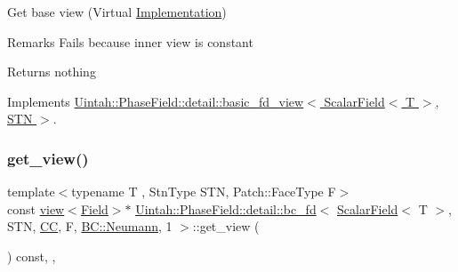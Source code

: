 Get base view (Virtual \hyperlink{classUintah_1_1PhaseField_1_1Implementation}{Implementation}) 

\begin{DoxyRemark}{Remarks}
Fails because inner view is constant
\end{DoxyRemark}
\begin{DoxyReturn}{Returns}
nothing 
\end{DoxyReturn}


Implements \hyperlink{classUintah_1_1PhaseField_1_1detail_1_1basic__fd__view_3_01ScalarField_3_01T_01_4_00_01STN_01_4_a2bbf870b332cfd997ec5297428019bc8}{Uintah\+::\+Phase\+Field\+::detail\+::basic\+\_\+fd\+\_\+view$<$ Scalar\+Field$<$ T $>$, S\+T\+N $>$}.

\mbox{\label{classUintah_1_1PhaseField_1_1detail_1_1bc__fd_3_01ScalarField_3_01T_01_4_00_01STN_00_01CC_00_01F_00_01BC_1_1Neumann_00_011_01_4_a158cefd68ffdfd59e5590b850c7ca78f}} 
\subsubsection{\texorpdfstring{get\+\_\+view()}{get\_view()}\hspace{0.1cm}{\footnotesize\ttfamily [2/2]}}
{\footnotesize\ttfamily template$<$typename T , Stn\+Type S\+TN, Patch\+::\+Face\+Type F$>$ \\
const \hyperlink{classUintah_1_1PhaseField_1_1detail_1_1view}{view}$<$\hyperlink{structUintah_1_1PhaseField_1_1ScalarField}{Field}$>$$\ast$ \hyperlink{classUintah_1_1PhaseField_1_1detail_1_1bc__fd}{Uintah\+::\+Phase\+Field\+::detail\+::bc\+\_\+fd}$<$ \hyperlink{structUintah_1_1PhaseField_1_1ScalarField}{Scalar\+Field}$<$ T $>$, S\+TN, \hyperlink{namespaceUintah_1_1PhaseField_a33d355affda78a83f45755ba8388cedda22303704507d024d1d6508ed9859a85a}{CC}, F, \hyperlink{namespaceUintah_1_1PhaseField_a148fba372aa3be96fd6eede7a2fa10b5ab8537a769dbc90cb1762215441212152}{B\+C\+::\+Neumann}, 1 $>$\+::get\+\_\+view (\begin{DoxyParamCaption}{ }\end{DoxyParamCaption}) const\hspace{0.3cm}{\ttfamily [inline]}, {\ttfamily [override]}, {\ttfamily [virtual]}}



